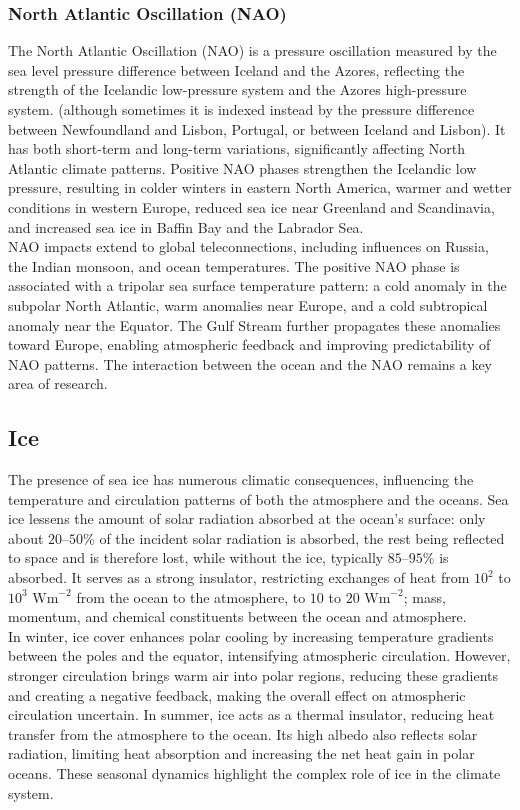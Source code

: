 \subsubsection{North Atlantic Oscillation (NAO)}
The North Atlantic Oscillation (NAO) is a pressure oscillation measured by the sea level pressure difference between Iceland and the Azores, reflecting the strength of the Icelandic low-pressure system and the Azores high-pressure system. (although sometimes it is indexed instead by the pressure difference between Newfoundland and Lisbon, Portugal, or between Iceland and Lisbon). It has both short-term and long-term variations, significantly affecting North Atlantic climate patterns. Positive NAO phases strengthen the Icelandic low pressure, resulting in colder winters in eastern North America, warmer and wetter conditions in western Europe, reduced sea ice near Greenland and Scandinavia, and increased sea ice in Baffin Bay and the Labrador Sea. \\
NAO impacts extend to global teleconnections, including influences on Russia, the Indian monsoon, and ocean temperatures. The positive NAO phase is associated with a tripolar sea surface temperature pattern: a cold anomaly in the subpolar North Atlantic, warm anomalies near Europe, and a cold subtropical anomaly near the Equator. The Gulf Stream further propagates these anomalies toward Europe, enabling atmospheric feedback and improving predictability of NAO patterns. The interaction between the ocean and the NAO remains a key area of research.



\subsection{Ice}
The presence of sea ice has numerous climatic consequences, influencing the temperature and circulation patterns of both the atmosphere and the oceans. Sea ice lessens the amount of solar radiation absorbed at the ocean's surface: only about $20–50$\% of the incident solar radiation is absorbed, the rest being reflected to space and is therefore lost, while without the ice, typically $85–95$\% is absorbed.
It serves as a strong insulator, restricting exchanges of heat from $10^2$ to $10^3 \,\,\text{Wm}^{-2}$  from the ocean to the atmosphere, to $10$ to $20 \,\,\text{Wm}^{-2}$;   mass, momentum, and chemical constituents between the ocean and atmosphere. \\
In winter, ice cover enhances polar cooling by increasing temperature gradients between the poles and the equator, intensifying atmospheric circulation. However, stronger circulation brings warm air into polar regions, reducing these gradients and creating a negative feedback, making the overall effect on atmospheric circulation uncertain. In summer, ice acts as a thermal insulator, reducing heat transfer from the atmosphere to the ocean. Its high albedo also reflects solar radiation, limiting heat absorption and increasing the net heat gain in polar oceans. These seasonal dynamics highlight the complex role of ice in the climate system.\\

